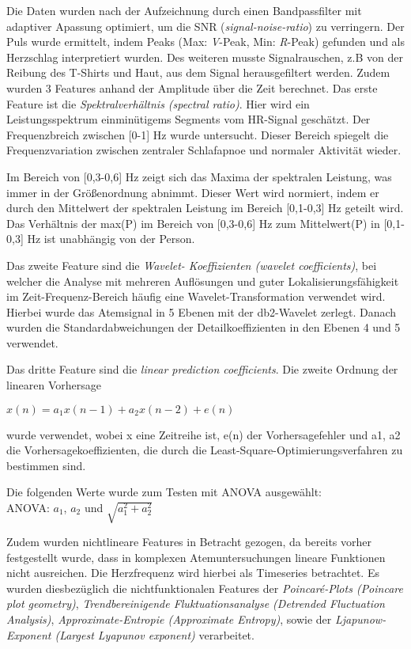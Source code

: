 Die Daten wurden nach der Aufzeichnung durch einen Bandpassfilter mit adaptiver Apassung optimiert, um die SNR (\textit{signal-noise-ratio}) zu verringern.
Der Puls wurde ermittelt, indem Peaks (Max: \textit{V}-Peak, Min: \textit{R}-Peak) gefunden und als Herzschlag interpretiert wurden.
Des weiteren musste Signalrauschen, z.B von der Reibung des T-Shirts und Haut, aus dem Signal herausgefiltert werden. 
Zudem wurden 3 Features anhand der Amplitude über die Zeit berechnet. 
Das erste Feature ist die \textit{Spektralverhältnis (spectral ratio)}. 
Hier wird ein Leistungsspektrum einminütigems Segments vom HR-Signal geschätzt. 
Der Frequenzbreich zwischen [0-1] $\si{\hertz}$ wurde untersucht. 
Dieser Bereich spiegelt die Frequenzvariation zwischen zentraler Schlafapnoe und normaler Aktivität wieder.

Im Bereich von [0,3-0,6] Hz zeigt sich das Maxima der spektralen Leistung, was immer in der Größenordnung abnimmt. 
Dieser Wert wird normiert, indem er durch den Mittelwert der spektralen Leistung im Bereich [0,1-0,3] Hz geteilt wird. 
Das Verhältnis der max(P) im Bereich von [0,3-0,6] Hz zum Mittelwert(P) in [0,1-0,3] Hz ist unabhängig von der Person.

Das zweite Feature sind die \textit{Wavelet- Koeffizienten (wavelet coefficients)}, bei welcher die Analyse mit mehreren Auflösungen und guter Lokalisierungsfähigkeit im Zeit-Frequenz-Bereich häufig eine Wavelet-Transformation verwendet wird. 
Hierbei wurde das Atemsignal in 5 Ebenen mit der db2-Wavelet zerlegt. Danach wurden die Standardabweichungen der Detailkoeffizienten in den Ebenen 4 und 5 verwendet. 

Das dritte Feature sind die \textit{linear prediction coefficients}. 
Die zweite Ordnung der linearen Vorhersage
\begin{center}
    $x(n) = a_1 x(n-1) + a_2 x(n-2) + e(n)$
\end{center} 
wurde verwendet, wobei x eine Zeitreihe ist, e(n) der Vorhersagefehler und {a1, a2} die Vorhersagekoeffizienten, die durch die Least-Square-Optimierungsverfahren zu bestimmen sind.

Die folgenden Werte wurde zum Testen mit ANOVA ausgewählt: \\
ANOVA: $a_1$, $a_2$ und $\sqrt{a_1^{2} + a_2^{2}}$


Zudem wurden nichtlineare Features in Betracht gezogen, da bereits vorher festgestellt wurde, dass in komplexen Atemuntersuchungen lineare Funktionen nicht ausreichen. Die Herzfrequenz wird hierbei als Timeseries betrachtet.
Es wurden diesbezüglich die nichtfunktionalen Features der \textit{Poincaré-Plots (Poincare plot geometry)}, \textit{Trendbereinigende Fluktuationsanalyse (Detrended Fluctuation Analysis)}, \textit{Approximate-Entropie (Approximate Entropy)}, sowie der \textit{Ljapunow-Exponent (Largest Lyapunov exponent)} verarbeitet. 

